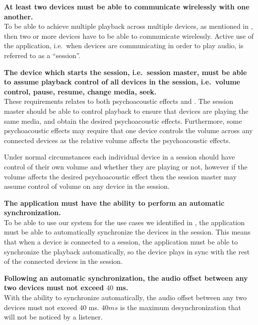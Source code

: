 \begin{eletterate}
    \item\label{req:wireless} \textbf{At least two devices must be able to communicate wirelessly with one another.} \hfill\\
        To be able to achieve multiple playback across multiple devices, as mentioned in ,
        then two or more devices have to be able to communicate wirelessly.
        Active use of the application, i.e.~when devices are communicating in order to play audio, is referred to as a ``session''.

    \item\label{req:host_control} \textbf{The device which starts the session, i.e.~session master, must be able to assume playback control of all devices in the session, i.e.~volume control, pause, resume, change media, seek.} \hfill\\
        These requirements relates to both psychoacoustic effects and .
        The session master should be able to control playback to ensure that devices are playing the same media, and obtain the desired psychoacoustic effects.
        Furthermore, some psychoacoustic effects may require that one device controls the volume across any connected devices as the relative volume affects the psychoacoustic effects.

        Under normal circumstances each individual device in a session should have control of their own volume and whether they are playing or not, however if the volume affects the desired psychoacoustic effect then the session master may assume control of volume on any device in the session.


    \item\label{req:sync} \textbf{The application must have the ability to perform an automatic synchronization.} \hfill\\
        To be able to use our system for the use cases we identified in ,
        the application must be able to automatically synchronize the devices in the session.
        This means that when a device is connected to a session, the application must be able to synchronize the playback automatically,
        so the device plays in sync with the rest of the connected devices in the session.

    \begin{eletterate}
        \item\label{req:auto_off} \textbf{Following an automatic synchronization, the audio offset between any two devices must not exceed $40$ ms.} \hfill\\
            With the ability to synchronize automatically, the audio offset between any two devices must not exceed $40$ ms.
            $40 ms$ is the maximum desynchronization that will not be noticed by a listener.


\end{eletterate}
\end{eletterate}
